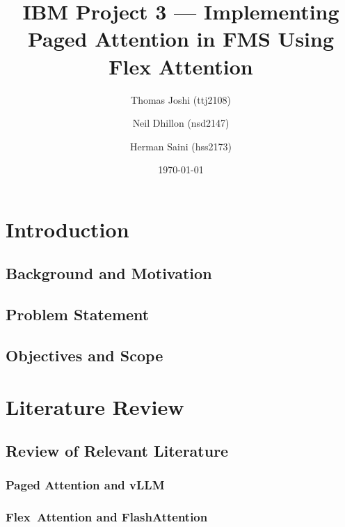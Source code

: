 \documentclass[11pt]{article}
\title{IBM Project 3 --- Implementing Paged Attention in FMS Using Flex Attention}
\author{
  Thomas Joshi (ttj2108) \and
  Neil Dhillon (nsd2147) \and
  Herman Saini (hss2173)
}
\date{\today}
\begin{document}
\maketitle
\begin{abstract}
\end{abstract}

\tableofcontents
\newpage

\section{Introduction}
  \subsection{Background and Motivation}
  
  \subsection{Problem Statement}
  
  \subsection{Objectives and Scope}

\section{Literature Review}
  \subsection{Review of Relevant Literature}
  \subsubsection{Paged Attention and vLLM}

  \subsubsection{Flex Attention and FlashAttention}
\end{document}
